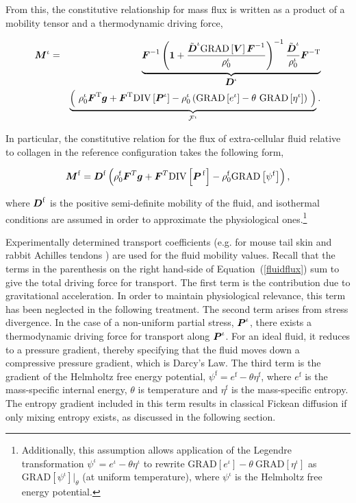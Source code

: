 \noindent From this, the constitutive relationship for mass flux is
written as a product of a mobility tensor and a thermodynamic driving
force,

\begin{eqnarray}
\mbox{\boldmath$ M$}^\iota & = &\underbrace{\mbox{\boldmath$ F$}^{-1}\left({\bf 1} +
  \frac{\tilde{\mbox{\boldmath$ D$}}^\iota\mathrm{GRAD}\left[\mbox{\boldmath$ V$}\right]
    \mbox{\boldmath$ F$}^{-1}}{\rho^\iota_0}\right)^{-1}
  \frac{\tilde{\mbox{\boldmath$ D$}}^\iota}{\rho^\iota_0}\mbox{\boldmath$ F$}^{-\mathrm{T}}}_{\mbox{\boldmath$ D$}^\iota}
\nonumber\\ &&\underbrace{\left(\ \rho_0^\iota\mbox{\boldmath$ F$}^\mathrm{T}\mbox{\boldmath$ g$} +
  \mbox{\boldmath$ F$}^\mathrm{T}\mathrm{DIV}\left[\mbox{\boldmath$ P$}^\iota\right] -
  \rho^\iota_0\left(\mathrm{GRAD}\left[e^\iota\right] -
  \theta\ \mathrm{GRAD}\left[\eta^\iota\right]\right)\ \right)}
_{{\mathcal F}^\iota}.
\label{constitutive-relation-flux-3}
\end{eqnarray}

In particular, the constitutive relation for the flux of
extra-cellular fluid relative to collagen in the reference
configuration takes the following form,

\begin{equation}
\mbox{\boldmath$ M$}^\mathrm{f} = \mbox{\boldmath$ D$}^\mathrm{f}\left(\rho_0^\mathrm{f}\mbox{\boldmath$ F$}^T\mbox{\boldmath$ g$} +
\mbox{\boldmath$ F$}^T\mathrm{DIV}\left[\mbox{\boldmath$ P$}^{\,\mathrm{f}}\right] -
\rho_0^\mathrm{f}\mathrm{GRAD}\left[\psi^\mathrm{f}\right]\right),
\label{fluidflux}
\end{equation}

\noindent where $\mbox{\boldmath$ D$}^\mathrm{f}$ is the positive semi-definite
mobility of the fluid, and isothermal conditions are assumed in order
to approximate the physiological ones.\footnote{Additionally, this
  assumption allows application of the Legendre transformation
  \mbox{$\psi^\iota = e^\iota - \theta\eta^\iota$} to rewrite
  \mbox{$\mathrm{GRAD}\left[e^\iota\right] -
    \theta\ \mathrm{GRAD}\left[\eta^\iota\right]$} as
  $\mathrm{GRAD}\left[\psi^\iota\right]\vert_\theta$ (at uniform
  temperature), where $\psi^\iota$ is the Helmholtz free energy
  potential.}

Experimentally determined transport coefficients (e.g. for mouse tail
skin \citep{Swartzetal:99} and rabbit Achilles tendons
\citep{Hanetal:2000}) are used for the fluid mobility values. Recall
that the terms in the parenthesis on the right hand-side of
\mbox{Equation (\ref{fluidflux})} sum to give the total driving force
for transport. The first term is the contribution due to gravitational
acceleration. In order to maintain physiological relevance, this term
has been neglected in the following treatment. The second term arises
from stress divergence. In the case of a non-uniform partial stress,
$\mbox{\boldmath$ P$}^\iota$, there exists a thermodynamic driving force for transport
along $\mbox{\boldmath$ P$}^\iota$. For an ideal fluid, it reduces to a pressure
gradient, thereby specifying that the fluid moves down a compressive
pressure gradient, which is Darcy's Law. The third term is the
gradient of the Helmholtz free energy potential, $\psi^\mathrm{f} =
e^\mathrm{f} - \theta \eta^\mathrm{f}$, where $e^\mathrm{f}$ is the
mass-specific internal energy, $\theta$ is temperature and
$\eta^\mathrm{f}$ is the mass-specific entropy. The entropy gradient
included in this term results in classical Fickean diffusion if only
mixing entropy exists, as discussed in the following section.

